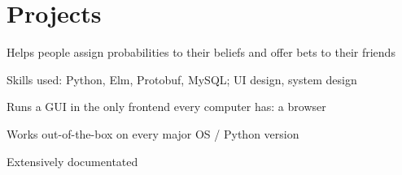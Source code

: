 \documentclass[]{resume}
\begin{document}
\begin{minipage}[t]{0.66\textwidth}
%
%





















\section{Projects}

\begin{tightemize}
\item Helps people assign probabilities to their beliefs and offer bets to their friends
\item Skills used: Python, Elm, Protobuf, MySQL; UI design, system design
\end{tightemize}
\sectionsep

\begin{tightemize}
\item Runs a GUI in the only frontend every computer has: a browser
\item Works out-of-the-box on every major OS / Python version
\item Extensively documentated
\end{tightemize}
\sectionsep


\end{minipage}
\end{document}
